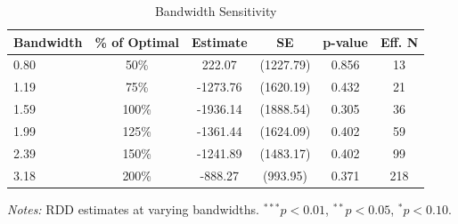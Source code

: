 \begin{table}[htbp]
\centering
\caption{Bandwidth Sensitivity}
\label{tab:bandwidth}
\begin{tabular}{lccccc}
\toprule
Bandwidth & \% of Optimal & Estimate & SE & p-value & Eff. N \\
\midrule
0.80 & 50\% & 222.07 & (1227.79) & 0.856 & 13 \\
1.19 & 75\% & -1273.76 & (1620.19) & 0.432 & 21 \\
1.59 & 100\% & -1936.14 & (1888.54) & 0.305 & 36 \\
1.99 & 125\% & -1361.44 & (1624.09) & 0.402 & 59 \\
2.39 & 150\% & -1241.89 & (1483.17) & 0.402 & 99 \\
3.18 & 200\% & -888.27 & (993.95) & 0.371 & 218 \\
\bottomrule
\end{tabular}
\begin{tablenotes}
\small
\item \textit{Notes:} RDD estimates at varying bandwidths. $^{***}p<0.01$, $^{**}p<0.05$, $^{*}p<0.10$.
\end{tablenotes}
\end{table}

